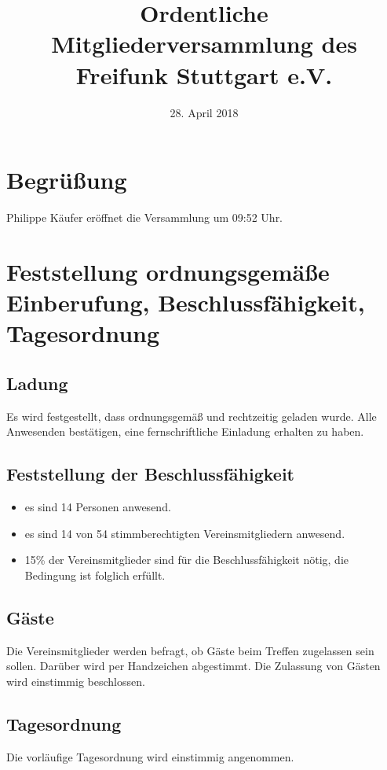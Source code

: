 \documentclass[a4paper]{scrartcl}
\date{28. April 2018}
\title{Ordentliche Mitgliederversammlung des Freifunk Stuttgart e.V.}
\begin{document}
\maketitle

\tableofcontents

\clearpage

\listoftables

\clearpage

\section{Begrüßung}
Philippe Käufer eröffnet die Versammlung um 09:52 Uhr.

\section{Feststellung ordnungsgemäße Einberufung, Beschlussfähigkeit, Tagesordnung}
\subsection{Ladung}
Es wird festgestellt, dass ordnungsgemäß und rechtzeitig geladen wurde. Alle Anwesenden bestätigen, eine fernschriftliche Einladung erhalten zu haben.

\subsection{Feststellung der Beschlussfähigkeit}
\begin{itemize}
\item es sind 14 Personen anwesend.
\item es sind 14 von 54 stimmberechtigten Vereinsmitgliedern anwesend.
\item 15\% der Vereinsmitglieder sind für die Beschlussfähigkeit nötig, die Bedingung ist folglich erfüllt.
\end{itemize}
\subsection{Gäste}
Die Vereinsmitglieder werden befragt, ob Gäste beim Treffen zugelassen sein sollen. Darüber wird per Handzeichen abgestimmt. Die Zulassung von Gästen wird einstimmig beschlossen.

\subsection{Tagesordnung}
Die vorläufige Tagesordnung wird einstimmig angenommen.
\end{document}
